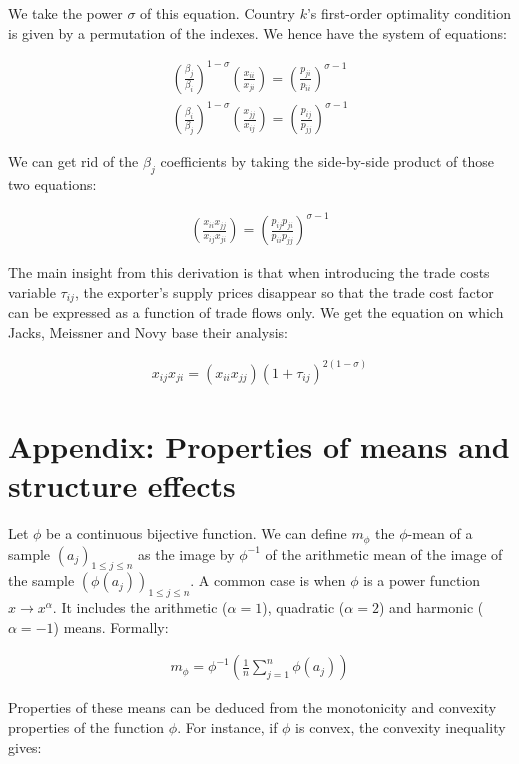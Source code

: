 \documentclass{article}
\begin{document}
We take the power $\sigma$ of this equation. Country $k$'s
first-order optimality condition is given by a permutation of
the indexes. We hence have the system of equations:

\begin{eqnarray*}
\left(\frac{\beta_j}{\beta_i}\right)^{1-\sigma}\left(\frac{x_{ii}}{x_{ji}}\right)=\left(\frac{p_{ji}}{p_{ii}}\right)^{\sigma-1}\\
\left(\frac{\beta_i}{\beta_j}\right)^{1-\sigma}\left(\frac{x_{jj}}{x_{ij}}\right)=\left(\frac{p_{ij}}{p_{jj}}\right)^{\sigma-1}
\end{eqnarray*}

We can get rid of the $\beta_j$ coefficients by taking the
side-by-side product of those two equations:

\begin{eqnarray*}
\left(\frac{x_{ii} x_{jj}}{x_{ij} x_{ji}}\right)=\left(\frac{p_{ij}
p_{ji}}{p_{ii} p_{jj}}\right)^{\sigma-1}
\end{eqnarray*}

The main insight from this derivation is that when introducing
the trade costs variable $\tau_{ij}$, the exporter's supply
prices disappear so that the trade cost factor can be expressed
as a function of trade flows only. We get the equation on which
Jacks, Meissner and Novy base their analysis:

\begin{eqnarray*}
x_{ij} x_{ji} =(x_{ii} x_{jj}) (1+\tau_{ij})^{2(1-\sigma)}
\end{eqnarray*}

\section{\label{A2}Appendix: Properties of means and structure effects}


Let $\phi$ be a continuous bijective function. We can define
$m_{\phi}$ the $\phi$-mean of a sample $(a_j)_{1\leq j\leq n}$
as the image by $\phi^{-1}$ of the arithmetic mean of the image
of the sample $(\phi(a_j))_{1\leq j\leq n}$. A common case is
when $\phi$ is a power function $x \rightarrow x^\alpha$. It
includes the arithmetic ($\alpha=1$), quadratic ($\alpha=2$)
and harmonic ($\alpha=-1$) means. Formally:

\begin{eqnarray*}
m_{\phi}=\phi^{-1}\left(\frac{1}{n}\sum_{j=1}^n \phi(a_j)\right)
\end{eqnarray*}

Properties of these means can be deduced from the monotonicity
and convexity properties of the function $\phi$. For instance,
if $\phi$ is convex, the convexity inequality gives:
\end{document}
